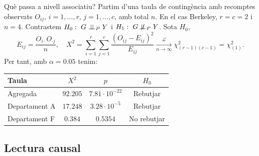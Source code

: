 \documentclass{bestbeamer}
\begin{document}
\begin{frame}{Què passa a nivell associatiu?}
  \small
  Partim d'una taula de contingència amb recomptes observats $O_{ij}$, $i=1,\ldots,r$, $j=1,\ldots,c$, amb total $n$. En el cas Berkeley, $r=c=2$ i $n=4$. Contrastem $H_0:\ G\perp\!\!\!\perp_P Y$ i $H_1:\ G\not\!\perp\!\!\!\perp_P Y$. Sota $H_0$,
  \[
    E_{ij}=\frac{O_{i\cdot}O_{\cdot j}}{n}, \quad X^2=\sum_{i=1}^{r}\sum_{j=1}^{c}\frac{(O_{ij}-E_{ij})^2}{E_{ij}} \xrightarrow[n\to\infty]{\mathcal{L}} \chi^2_{(r-1)(c-1)}=\chi^2_{(1)}.
  \]
  Per tant, amb $\alpha=0.05$ tenim:
  \begin{table}[H]
  \scriptsize
  \setlength{\tabcolsep}{6pt}
  \renewcommand{\arraystretch}{1.15}
  \begin{tabular}{@{}lccc@{}}
    \toprule
    Taula & $X^2$ & $p$ & $H_0$ \\
    \midrule
    Agregada & $92.205$ & $7.81{\cdot}10^{-22}$ & Rebutjar \\
    Departament A & $17.248$ & $3.28{\cdot}10^{-5}$ & Rebutjar \\
    Departament F & $0.384$ & $0.5354$ & No rebutjar \\
    \bottomrule
  \end{tabular}
  \end{table}
\end{frame}

\subsection{Lectura causal}
\end{document}
